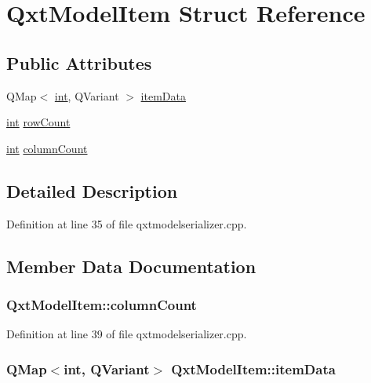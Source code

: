 \hypertarget{struct_qxt_model_item}{\section{Qxt\-Model\-Item Struct Reference}
\label{struct_qxt_model_item}
}
\subsection*{Public Attributes}
\begin{DoxyCompactItemize}
\item 
Q\-Map$<$ \hyperlink{ioapi_8h_a787fa3cf048117ba7123753c1e74fcd6}{int}, Q\-Variant $>$ \hyperlink{struct_qxt_model_item_a2b4a8879383dbe90999764b8c9bcc203}{item\-Data}
\item 
\hyperlink{ioapi_8h_a787fa3cf048117ba7123753c1e74fcd6}{int} \hyperlink{struct_qxt_model_item_a5302c19d17dc0e92f7ac65ee2c073ce8}{row\-Count}
\item 
\hyperlink{ioapi_8h_a787fa3cf048117ba7123753c1e74fcd6}{int} \hyperlink{struct_qxt_model_item_a6ae04e31c04ee0776183f48b95c89fa4}{column\-Count}
\end{DoxyCompactItemize}


\subsection{Detailed Description}


Definition at line 35 of file qxtmodelserializer.\-cpp.



\subsection{Member Data Documentation}
\hypertarget{struct_qxt_model_item_a6ae04e31c04ee0776183f48b95c89fa4}{
\subsubsection[{column\-Count}]{ Qxt\-Model\-Item\-::column\-Count}}\label{struct_qxt_model_item_a6ae04e31c04ee0776183f48b95c89fa4}


Definition at line 39 of file qxtmodelserializer.\-cpp.

\hypertarget{struct_qxt_model_item_a2b4a8879383dbe90999764b8c9bcc203}{
\subsubsection[{item\-Data}]{\setlength{\rightskip}{0pt plus 5cm}Q\-Map$<${\bf int}, Q\-Variant$>$ Qxt\-Model\-Item\-::item\-Data}}\label{struct_qxt_model_item_a2b4a8879383dbe90999764b8c9bcc203}


